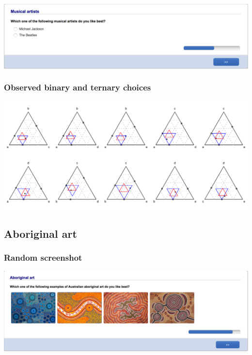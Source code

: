 \documentclass[11pt,letter]{article}
\begin{document}
\includegraphics[width=15cm]{Population_study_design/screenshot_music.png}

\subsubsection*{Observed binary and ternary choices}

\includegraphics[width=15cm]{./Population_study_data/Simplexes/music.pdf}

\pagebreak

\subsection*{Aboriginal art}



\subsubsection*{Random screenshot}

\includegraphics[width=15cm]{Population_study_design/screenshot_aboriginal_art.png}
\end{document}
